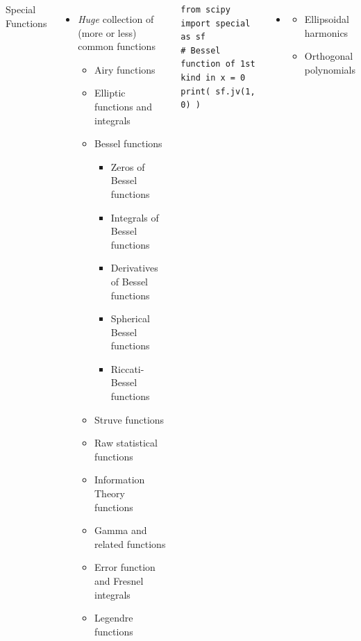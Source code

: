 
\begin{frame}[fragile]
%
\begin{columns}[T]
\begin{Large}
	{Special Functions}
	\vspace{6pt}
\end{Large}
%
\begin{itemize}
\item \emph{Huge} collection of (more or less) common functions
	\begin{itemize}
	\item Airy functions
	\item Elliptic functions and integrals
	\item Bessel functions
		\begin{itemize}
		\item Zeros of Bessel functions
		\item Integrals of Bessel functions
		\item Derivatives of Bessel functions
		\item Spherical Bessel functions
		\item Riccati-Bessel functions
		\end{itemize}
	\item Struve functions
	\item Raw statistical functions
	\item Information Theory functions
	\item Gamma and related functions
	\item Error function and Fresnel integrals
	\item Legendre functions
	\end{itemize}
\end{itemize}
%
\begin{codebox}
\begin{verbatim}
from scipy import special as sf
# Bessel function of 1st kind in x = 0
print( sf.jv(1, 0) ) 
\end{verbatim}
\end{codebox}
%
\begin{itemize}
\item[]
\begin{itemize}
	\item Ellipsoidal harmonics
	\item Orthogonal polynomials

\end{itemize}
\end{itemize}
\end{columns}
\end{frame}
